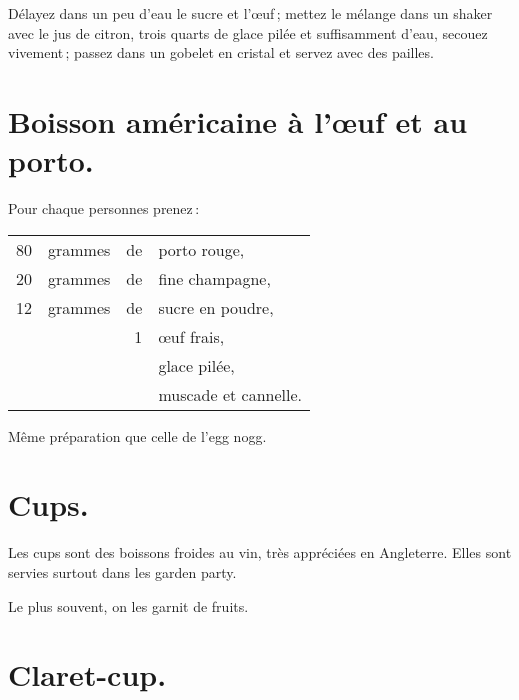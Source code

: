 Délayez dans un peu d'eau le sucre et l'œuf ; mettez le mélange dans un shaker
avec le jus de citron, trois quarts de glace pilée et suffisamment d'eau,
secouez vivement ; passez dans un gobelet en cristal et servez avec des
pailles.

\section*{\centering Boisson américaine à l'œuf et au porto.}
{}

Pour chaque personnes prenez :

\footnotesize
\begin{longtable}{rrrp{16em}}
     80 & grammes & de & porto rouge,                                                                     \\
     20 & grammes & de & fine champagne,                                                                  \\
     12 & grammes & de & sucre en poudre,                                                                 \\
        &         &  1 & œuf frais,                                                                       \\
        &         &    & glace pilée,                                                                     \\
        &         &    & muscade et cannelle.                                                             \\
\end{longtable}
\normalsize

Même préparation que celle de l'egg nogg.

\section*{\centering Cups.}
{}

Les cups sont des boissons froides au vin, très appréciées en Angleterre. Elles
sont servies surtout dans les garden party.

Le plus souvent, on les garnit de fruits.

\section*{\centering Claret-cup.}
{}

